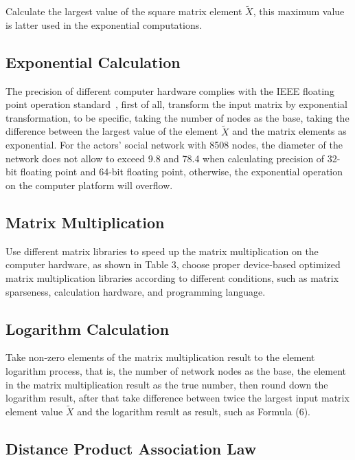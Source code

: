 \documentclass[review]{cvpr}
\begin{document}
Calculate the largest value of the square matrix element $\widetilde X$, this maximum value is latter used in the exponential computations.

\subsection{Exponential Calculation}

The precision of different computer hardware complies with the IEEE floating point operation standard~\cite{ieee1985ieee},
first of all, transform the input matrix by exponential transformation, to be specific, taking the number of nodes as the base,
taking the difference between the largest value of the element $\widetilde X$ and the matrix elements as exponential.
For the actors' social network with 8508 nodes, the diameter of the network does not allow to exceed 9.8 and 78.4 when calculating precision of 32-bit floating point and 64-bit floating point,
otherwise, the exponential operation on the computer platform will overflow.

\subsection{Matrix Multiplication}
Use different matrix libraries to speed up the matrix multiplication on the computer hardware, as shown in Table 3, choose proper device-based optimized matrix multiplication libraries according to different conditions, such as matrix sparseness, calculation hardware, and programming language.

\subsection{Logarithm Calculation}
Take non-zero elements of the matrix multiplication result to the element logarithm process, that is, the number of network nodes as the base, the element in the matrix multiplication result as the true number, then round down the logarithm result,
after that take difference between twice the largest input matrix element value $\widetilde X$ and the logarithm result as result, such as Formula (6).

\subsection{Distance Product Association Law}
\end{document}
